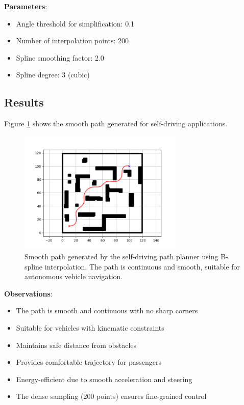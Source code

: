 \documentclass[aps,letterpaper,10pt]{revtex4}
\begin{document}
\textbf{Parameters}:
\begin{itemize}
    \item Angle threshold for simplification: 0.1
    \item Number of interpolation points: 200
    \item Spline smoothing factor: 2.0
    \item Spline degree: 3 (cubic)
\end{itemize}

\subsection{Results}

Figure \ref{fig:task3} shows the smooth path generated for self-driving applications.

\begin{figure}[H]
  \centering
  \includegraphics[width=0.7\textwidth]{assets/task-3.png}
  \caption{Smooth path generated by the self-driving path planner using B-spline interpolation. The path is continuous and smooth, suitable for autonomous vehicle navigation.}
  \label{fig:task3}
\end{figure}

\textbf{Observations}:
\begin{itemize}
    \item The path is smooth and continuous with no sharp corners
    \item Suitable for vehicles with kinematic constraints
    \item Maintains safe distance from obstacles
    \item Provides comfortable trajectory for passengers
    \item Energy-efficient due to smooth acceleration and steering
    \item The dense sampling (200 points) ensures fine-grained control
\end{itemize}
\end{document}

